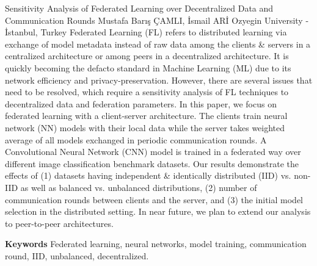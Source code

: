 
    \begin{abstract_online}{Sensitivity Analysis of Federated Learning over Decentralized Data and Communication Rounds}{%
        Mustafa Barış ÇAMLI, İsmail ARİ}{%
        }{%
        Ozyegin University - İstanbul, Turkey}
    Federated Learning (FL) refers to distributed learning via exchange of model metadata instead of raw data among the clients & servers in a centralized architecture or among peers in a decentralized architecture. It is quickly becoming the defacto standard in Machine Learning (ML) due to its network efficiency and privacy-preservation. However, there are several issues that need to be resolved, which require a sensitivity analysis of FL techniques to decentralized data and federation parameters. In this paper, we focus on federated learning with a client-server architecture. The clients train neural network (NN) models with their local data while the server takes weighted average of all models exchanged in periodic communication rounds. A Convolutional Neural Network (CNN) model is trained in a federated way over different image classification benchmark datasets. Our results demonstrate the effects of (1) datasets having independent & identically distributed (IID) vs. non-IID as well as balanced vs. unbalanced distributions, (2) number of communication rounds between clients and the server, and (3) the initial model selection in the distributed setting. In near future, we plan to extend our analysis to peer-to-peer architectures. 
    
        \textbf{Keywords} \newline{}Federated learning, neural networks, model training, communication round, IID, unbalanced, decentralized.
    \end{abstract_online}
    